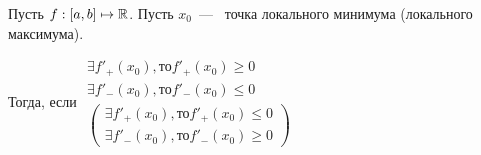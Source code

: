 \begin{lemma}
	Пусть $f: [a, b] \mapsto \mathbb{R}$. Пусть $x_{0}$~---~ точка локального минимума (локального максимума).
	
	Тогда, если $ \begin{gathered}
		\exists f'_{+} (x_{0}), \textrm{то}  f'_{+} (x_{0}) \geq 0 \\
		\exists f'_{-} (x_{0}), \textrm{то}  f'_{-} (x_{0}) \leq 0 \\
		\left(
		\begin{gathered}
			\exists f'_{+} (x_{0}), \textrm{то} f'_{+} (x_{0}) \leq 0 \\
			\exists f'_{-} (x_{0}), \textrm{то} f'_{-} (x_{0}) \geq 0			
		\end{gathered}
		\right)
	\end{gathered}$
\end{lemma}
